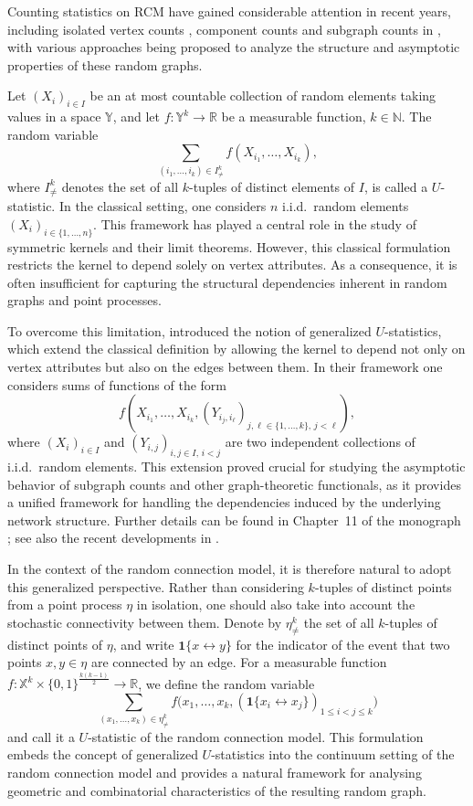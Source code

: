 \documentclass{article}
\theoremstyle{definition}
\numberwithin{equation}{section}
\theoremstyle{remark}
\begin{document}
Counting statistics on RCM have gained considerable attention in recent years, including isolated vertex counts \cite{Penrose2}, component counts \cite{Last_Nestmann_Schulte} and subgraph counts in \cite{can2022, LiuPrivault,LiuPrivault25b},
with various approaches being proposed to analyze the structure and asymptotic properties of these random graphs.

Let $(X_i)_{i\in I}$ be an at most countable collection of random elements taking values in a space $\mathbb{Y}$, and let $f:\mathbb{Y}^k\to\mathbb{R}$ be a measurable function, $k\in\mathbb{N}$. The random variable
\[
\sum_{(i_1,\ldots,i_k)\in I^k_{\neq}} f(X_{i_1},\ldots,X_{i_k}),
\]
where $I^k_{\neq}$ denotes the set of all $k$-tuples of distinct elements of $I$, is called a $U$-statistic. In the classical setting, one considers $n$ i.i.d.\ random elements $(X_i)_{i\in\{1,\ldots,n\}}$. This framework has played a central role in the study of symmetric kernels and their limit theorems. However, this classical formulation restricts the kernel to depend solely on vertex attributes. As a consequence, it is often insufficient for capturing the structural dependencies inherent in random graphs and point processes.

To overcome this limitation, \cite{Janson91} introduced the notion of generalized $U$-statistics, which extend the classical definition by allowing the kernel to depend not only on vertex attributes but also on the edges between them. In their framework one considers sums of functions of the form
$$
f(X_{i_1},\ldots,X_{i_k},(Y_{i_j,i_\ell})_{j,\ell\in\{1,\dots,k\},\, j<\ell}),
$$
where $(X_i)_{i\in I}$ and $(Y_{i,j})_{i,j\in I,\,i<j}$ are two independent collections of i.i.d.\ random elements. This extension proved crucial for studying the asymptotic behavior of subgraph counts and other graph-theoretic functionals, as it provides a unified framework for handling the dependencies induced by the underlying network structure. Further details can be found in Chapter~11 of the monograph \cite{janson}; see also the recent developments in \cite{zhangzs,bhattacharya23}.

In the context of the random connection model, it is therefore natural to adopt this generalized perspective. Rather than considering $k$-tuples of distinct points from a point process $\eta$ in isolation, one should also take into account the stochastic connectivity between them. Denote by $\eta^k_{\neq}$ the set of all $k$-tuples of distinct points of $\eta$, and write $\mathbf{1}\{x\leftrightarrow y\}$ for the indicator of the event that two points $x,y\in\eta$ are connected by an edge. For a measurable function $f:\mathbb{X}^k\times \{0,1\}^{\frac{k(k-1)}{2}}\to\mathbb{R}$,
we define the random variable
\begin{equation}\label{eqn:Ustatistic_RCM}
\sum_{(x_1,\ldots,x_k)\in\eta^k_{\neq}}
f\big(x_1,\ldots,x_k,(\mathbf{1}\{x_i\leftrightarrow x_j\})_{1\le i<j\le k}\big)
\end{equation}
and call it a $U$-statistic of the random connection model. This formulation embeds the concept of generalized $U$-statistics into the continuum setting of the random connection model and provides a natural framework for analysing geometric and combinatorial characteristics of the resulting random graph.
\end{document}
